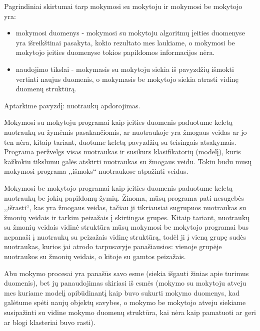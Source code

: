 Pagrindiniai skirtumai tarp mokymosi su mokytoju ir mokymosi be mokytojo yra:
\begin{itemize}
	\item mokymosi duomenys - mokymosi su mokytoju algoritmų įeities duomenyse
	yra	išreikštinai pasakyta, kokio rezultato mes laukiame, o mokymosi be
	mokytojo įeities duomenyse tokios papildomos informacijos nėra.
	\item  naudojimo tikslai - mokymasis su mokytoju siekia iš pavyzdžių
	išmokti vertinti naujus duomenis, o mokymasis be mokytojo siekia atrasti
	vidinę duomenų struktūrą.
\end{itemize}

Aptarkime pavyzdį: nuotraukų apdorojimas.

Mokymosi su mokytoju programai kaip įeities duomenis paduotume keletą 
nuotraukų su žymėmis pasakančiomis, ar nuotraukoje yra žmogaus veidas ar jo ten
nėra, kitaip tariant, duotume keletą pavyzdžių su teisingais atsakymais.
Programa peržvelgs visas nuotraukas ir susikurs klasifikatorių (modelį), kuris
kažkokiu tikslumu galės atskirti nuotraukas su žmogaus veidu. Tokiu būdu mūsų
mokymosi programa ,,išmoks`` nuotraukose atpažinti veidus.

Mokymosi be mokytojo programai kaip įeities duomenis paduotume keletą
nuotraukų be jokių papildomų žymių. Žinoma, mūsų programa pati nesugebės
,,išrasti``, kas yra žmogaus veidas, tačiau ji tikriausiai sugrupuos nuotraukas
su žmonių veidais ir tarkim peizažais į skirtingas grupes. Kitaip tariant,
nuotraukų su žmonių veidais vidinė struktūra mūsų mokymosi be mokytojo programai
bus nepanaši į nuotraukų su peizažais vidinę struktūrą, todėl ji į vieną grupę
sudės nuotraukas, kurios jai atrodo tarpusavyje panašiausios: vienoje
grupėje nuotraukos su žmonių veidais, o kitoje su gamtos peizažais.

Abu mokymo procesai yra panašūs savo esme (siekia išgauti žinias apie turimus
duomenis), bet jų panaudojimas skiriasi iš esmės (mokymo su mokytoju atveju mes
kuriame modelį apibūdinantį kaip buvo sukurti mokymo duomenys, kad galėtume
spėti naujų objektų savybes, o mokymo be mokytojo atveju siekiame susipažinti
su vidine mokymo duomenų struktūra, kai nėra kaip pamatuoti ar geri ar blogi
klasteriai buvo rasti).





